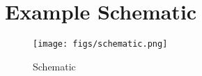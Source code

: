 \chapter{Example Schematic}\label{appendixb}
\begin{figure}[ht!]
  \centering
  \texttt{[image: figs/schematic.png]}
  \caption{Schematic}
  \label{fig:sche}
\end{figure}
